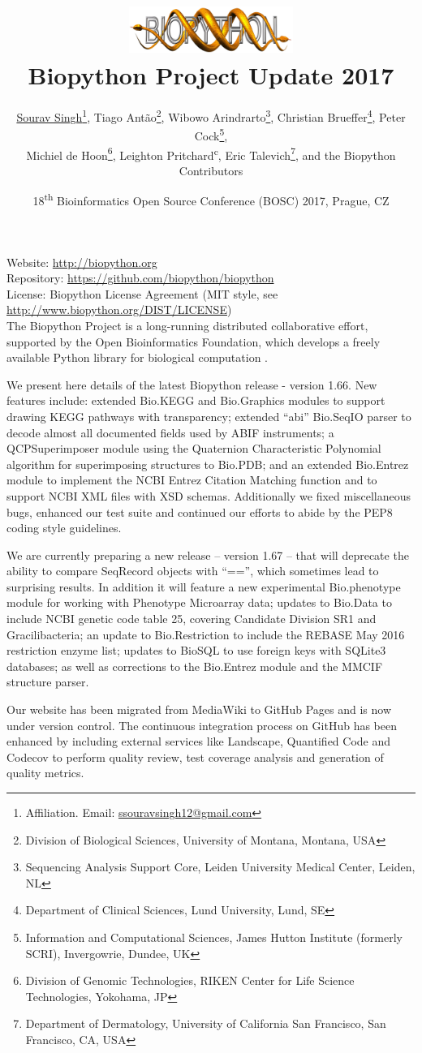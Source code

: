 \documentclass[10pt,oneside]{article}
\title{%
\vspace{-1.5in}
\includegraphics[width=0.4\textwidth]{biopython.jpg}\\
\vspace{3mm}Biopython Project Update 2017}
\author{
	\underline{Sourav Singh}\thanks{Affiliation. Email: \href{mailto:ssouravsingh12@gmail.com}{ssouravsingh12@gmail.com}},
    Tiago Ant\~{a}o\thanks{Division of Biological Sciences, University of Montana, Montana, USA},
    Wibowo Arindrarto\thanks{Sequencing Analysis Support Core, Leiden University Medical Center, Leiden, NL},
    Christian Brueffer\thanks{Department of Clinical Sciences, Lund University, Lund, SE},
    Peter Cock\thanks{Information and Computational Sciences, James Hutton Institute (formerly SCRI), Invergowrie, Dundee, UK},\\
    Michiel de Hoon\thanks{Division of Genomic Technologies, RIKEN Center for Life Science Technologies, Yokohama, JP},
    Leighton Pritchard\textsuperscript{c},  %
    Eric Talevich\thanks{Department of Dermatology, University of California San Francisco, San Francisco, CA, USA},
    and the Biopython Contributors}
\date{18\textsuperscript{th} Bioinformatics Open Source Conference (BOSC) 2017, Prague, CZ}
\begin{document}
\maketitle
\thispagestyle{empty}

\vspace{-0.2in}
\noindent
Website: \url{http://biopython.org} \\
Repository: \url{https://github.com/biopython/biopython} \\
License: Biopython License Agreement (MIT style, see \url{http://www.biopython.org/DIST/LICENSE}) \\

The Biopython Project is a long-running distributed collaborative effort,
supported by the Open Bioinformatics Foundation, which develops a freely
available Python library for biological computation \cite{AppNote}.

We present here details of the latest Biopython release - version 1.66. New
features include: extended Bio.KEGG and Bio.Graphics modules to support drawing
KEGG pathways with transparency; extended ``abi'' Bio.SeqIO parser to decode
almost all documented fields used by ABIF instruments; a QCPSuperimposer
module using the Quaternion Characteristic Polynomial algorithm for superimposing
structures to Bio.PDB; and an extended Bio.Entrez module to implement the NCBI
Entrez Citation Matching function and to support NCBI XML files with XSD schemas.
Additionally we fixed miscellaneous bugs, enhanced our test suite and continued our
efforts to abide by the PEP8 coding style guidelines.

We are currently preparing a new release -- version 1.67 -- that will deprecate the
ability to compare SeqRecord objects with ``=='', which sometimes lead to surprising
results.  In addition it will feature a new experimental Bio.phenotype module for
working with Phenotype Microarray data; updates to Bio.Data to include NCBI genetic
code table 25, covering Candidate Division SR1 and Gracilibacteria; an update to
Bio.Restriction to include the REBASE May 2016 restriction enzyme list; updates to
BioSQL to use foreign keys with SQLite3 databases; as well as corrections
to the Bio.Entrez module and the MMCIF structure parser.

Our website has been migrated from MediaWiki to GitHub Pages and is now under version
control.  The continuous integration process on GitHub has been enhanced by
including external services like Landscape, Quantified Code and Codecov to
perform quality review, test coverage analysis and generation of quality metrics.
\end{document}
